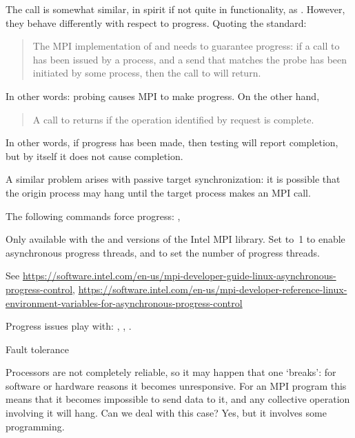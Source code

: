 \begin{remark}
  The  call is somewhat similar,
  in spirit if not quite in functionality,
  as . However, they behave differently with respect to progress.
  Quoting the standard:
  \begin{quote}
    The MPI implementation of  and
     needs to guarantee progress: if a call
    to  has been issued by a process, and a send that matches
    the probe has been initiated by some process, then the call to
     will return.
  \end{quote}
  In other words: probing causes MPI to make progress.
  On the other hand,
  \begin{quote}
    A call to  returns 
    if the operation identified by request is complete.
  \end{quote}
  In other words, if progress has been made, then testing will report completion,
  but by itself it does not cause completion.
\end{remark}

A similar problem arises with passive target synchronization:
it is possible that the origin process may hang until 
the target process makes an MPI call.

The following commands force progress:
,

\begin{intelnote}
  Only available with the 
  and  versions of the Intel MPI library.
  Set  to~1 to enable asynchronous progress threads,
  and  to set the number of progress threads.

  See \url{https://software.intel.com/en-us/mpi-developer-guide-linux-asynchronous-progress-control},
  \url{https://software.intel.com/en-us/mpi-developer-reference-linux-environment-variables-for-asynchronous-progress-control}
\end{intelnote}

Progress issues play with:
,
,
.

 {Fault tolerance}
\label{mpi:tolerant}

Processors are not completely reliable, so it may happen that one
`breaks': for software or hardware reasons it becomes
unresponsive. For an MPI program this means that it becomes impossible
to send data to it, and any collective operation involving it will
hang. Can we deal with this case? Yes, but it involves some
programming.

